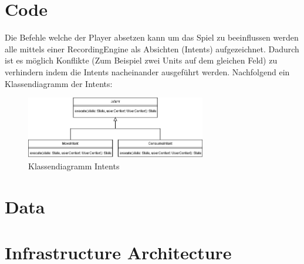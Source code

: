 \documentclass[a4paper, 11pt]{scrartcl}
\let\oldsection\section
\renewcommand\section{\clearpage\oldsection}
\begin{document}
\section{Code}
Die Befehle welche der Player absetzen kann um das Spiel zu beeinflussen werden alle mittels einer RecordingEngine als Absichten (Intents) aufgezeichnet.
Dadurch ist es möglich Konflikte (Zum Beispiel zwei Units auf dem gleichen Feld) zu verhindern indem die Intents nacheinander ausgeführt werden. 
Nachfolgend ein Klassendiagramm der Intents:
\begin{figure}[h]
  \caption{Klassendiagramm Intents}
  \centering
  \includegraphics[width=0.7\textwidth]{./img/Intent}
\end{figure}

\section{Data}

\section{Infrastructure Architecture}
\end{document}
